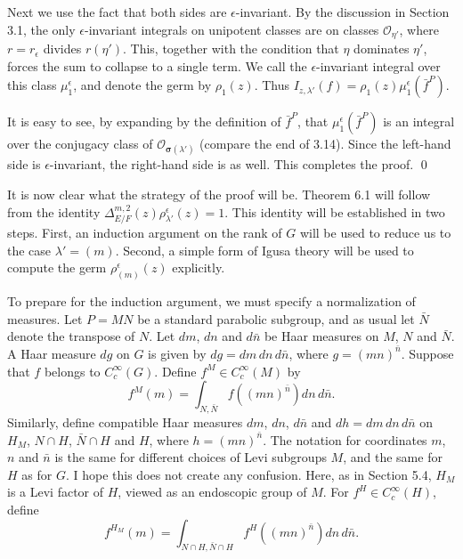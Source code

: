 \documentclass{amsart}
\begin{document}
Next we use the fact that both sides are
  $ \epsilon $-invariant.
  By the discussion in Section 3.1, the
only
  $ \epsilon $-invariant 
integrals
on unipotent classes are on classes
  $ \mathcal O_{\eta'} $,
where $r=r_\epsilon$ divides 
  $ r(\eta') $.
This, together with the condition that
  $ \eta $
dominates
  $ \eta' $,
forces the sum to collapse to a single term.
We call the $ \epsilon $-invariant integral over this class
  $ \mu_1^{\epsilon} $, and denote the germ by $ \rho_1 (z) $.  
  Thus $I_{z,\lambda'}(f) = \rho_1(z)\mu_1^\epsilon(\bar f^P)$.

It is easy to see, by expanding
by the definition of
  $ \bar f^{P} $,
that
  $ \mu_1^{\epsilon} 
    \left(
      \bar f^{P} 
    \right) $
is an integral over the conjugacy class of ${\mathcal O}_{\pmb\sigma(\lambda')}$
(compare the end of 3.14).
Since the left-hand side is $\epsilon$-invariant, the right-hand
side is as well.  This completes the proof.
\qed\finishpproclaim
\bigskip


It is now clear what the strategy of the proof will be.  Theorem 6.1 will follow from
the identity $\Delta^{m,2}_{E/F}(z)\rho^\epsilon_{\lambda'}(z)=1$.  This identity will
be established in two steps.  First, an induction argument on the rank of $G$  will be used to
reduce us to the case $\lambda'=(m)$.   Second, a simple form of Igusa theory
will be used to compute the germ $\rho^\epsilon_{(m)}(z)$ explicitly.

To prepare for the induction argument, we must specify a normalization
of measures.
Let $P=MN$ be a standard parabolic subgroup, and as usual let $\bar N$
denote the transpose of $N$.
Let $dm$, $dn$  and $d\bar n$ be Haar measures on $M$, $N$ and $\bar N$.
A Haar measure $dg$ on $G$ is given by $dg=dm\,dn\,d\bar n$, where $g = (mn)^{\bar n}$.
Suppose that $f$ belongs to $C_c^\infty(G)$.  Define $f^M\in C_c^\infty(M)$ by
$$f^M(m) = \int_{N,\bar N} f((mn)^{\bar n}) dn\,d\bar n.$$
Similarly, define compatible Haar measures $dm$, $dn$, $d\bar n$ and $dh = dm\,dn\,d\bar n$ on
$H_M$, $N\cap H$, $\bar N\cap H$ and $H$,
where $h=(mn)^{\bar n}$.  The notation for coordinates $m$, $n$ and $\bar n$
is the same for
different choices of Levi subgroups $M$, 
and the same for $H$ as for $G$.
I hope this does not create any confusion.
Here, as in Section 5.4, $H_M$ is a Levi factor of $H$, viewed as
an endoscopic group of $M$.
For $f^H\in C_c^\infty(H)$, define
$$f^{H_M}(m) = \int_{N\cap H,\bar N\cap H} f^H((mn)^{\bar n}) dn\,d\bar n.$$
\end{document}
